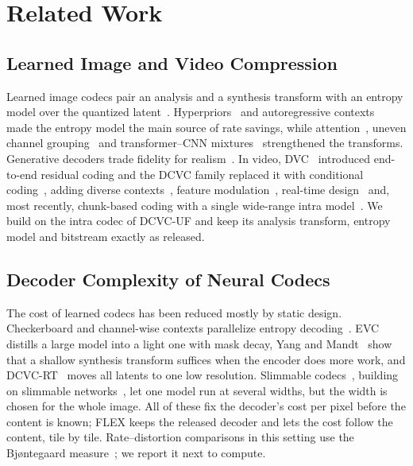 \section{Related Work}
\label{sec:related}

\subsection{Learned Image and Video Compression}
\label{sec:rw_nic}

Learned image codecs pair an analysis and a synthesis transform with an entropy model over the quantized latent~\cite{balle2017}.
Hyperpriors~\cite{balle2018} and autoregressive contexts~\cite{minnen2018,minnen2020channel,he2021checkerboard} made the entropy model the main source of rate savings, while attention~\cite{cheng2020}, uneven channel grouping~\cite{he2022elic} and transformer--CNN mixtures~\cite{liu2023tcm} strengthened the transforms.
Generative decoders trade fidelity for realism~\cite{mentzer2020,muckley2023illm}.
In video, DVC~\cite{lu2019dvc} introduced end-to-end residual coding and the DCVC family replaced it with conditional coding~\cite{li2021dcvc}, adding diverse contexts~\cite{li2023dcvcdc}, feature modulation~\cite{li2024dcvcfm}, real-time design~\cite{jia2025dcvcrt} and, most recently, chunk-based coding with a single wide-range intra model~\cite{li2026dcvcuf}.
We build on the intra codec of DCVC-UF and keep its analysis transform, entropy model and bitstream exactly as released.

\subsection{Decoder Complexity of Neural Codecs}
\label{sec:rw_complexity}

The cost of learned codecs has been reduced mostly by static design.
Checkerboard and channel-wise contexts parallelize entropy decoding~\cite{he2021checkerboard,minnen2020channel}.
EVC~\cite{wang2023evc} distills a large model into a light one with mask decay, Yang and Mandt~\cite{yang2023shallow} show that a shallow synthesis transform suffices when the encoder does more work, and DCVC-RT~\cite{jia2025dcvcrt} moves all latents to one low resolution.
Slimmable codecs~\cite{yang2021slimcae}, building on slimmable networks~\cite{yu2019slimmable}, let one model run at several widths, but the width is chosen for the whole image.
All of these fix the decoder's cost per pixel before the content is known; FLEX keeps the released decoder and lets the cost follow the content, tile by tile.
Rate--distortion comparisons in this setting use the Bj{\o}ntegaard measure~\cite{bjontegaard2001}; we report it next to compute.


